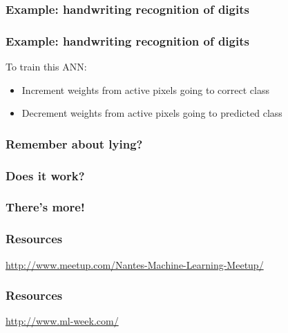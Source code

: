 \begin{frame}
  \frametitle{Example: handwriting recognition of digits}
\end{frame}

\begin{frame}
  \frametitle{Example: handwriting recognition of digits}
  To train this ANN:
  \begin{itemize}
  \item<1-> Increment weights from active pixels going to correct class
  \item<1-> Decrement weights from active pixels going to predicted class
  \end{itemize}
\end{frame}

\begin{frame}
  \frametitle{Remember about lying?}
\end{frame}

\begin{frame}
  \frametitle{Does it work?}
\end{frame}

\begin{frame}
  \frametitle{There's more!}
\end{frame}


\begin{frame}
  \frametitle{Resources}
  

  \vspace{5mm}
  \centerline{\Large\url{http://www.meetup.com/Nantes-Machine-Learning-Meetup/}}
\end{frame}

\begin{frame}
  \frametitle{Resources}

  \vspace{5mm}
  \centerline{\url{http://www.ml-week.com/}}
\end{frame}

\begin{frame}
\end{frame}


